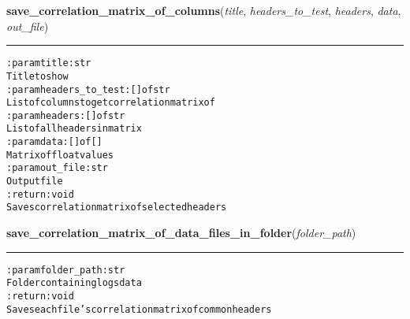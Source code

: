     \label{hal:ml:analysis:correlation:save_correlation_matrix_of_columns}

    \vspace{0.5ex}

\hspace{.8\funcindent}\begin{boxedminipage}{\funcwidth}

    \raggedright \textbf{save\_correlation\_matrix\_of\_columns}(\textit{title}, \textit{headers\_to\_test}, \textit{headers}, \textit{data}, \textit{out\_file})

    \vspace{-1.5ex}

    \rule{\textwidth}{0.5\fboxrule}
\setlength{\parskip}{2ex}
\begin{alltt}

:param title: str
    Title to show
:param headers\_to\_test: [] of str
    List of columns to get correlation matrix of
:param headers: [] of str
    List of all headers in matrix
:param data: [] of []
    Matrix of float values
:param out\_file: str
    Output file
:return: void
    Saves correlation matrix of selected headers
\end{alltt}

\setlength{\parskip}{1ex}
    \end{boxedminipage}

    \label{hal:ml:analysis:correlation:save_correlation_matrix_of_data_files_in_folder}

    \vspace{0.5ex}

\hspace{.8\funcindent}\begin{boxedminipage}{\funcwidth}

    \raggedright \textbf{save\_correlation\_matrix\_of\_data\_files\_in\_folder}(\textit{folder\_path})

    \vspace{-1.5ex}

    \rule{\textwidth}{0.5\fboxrule}
\setlength{\parskip}{2ex}
\begin{alltt}

:param folder\_path: str
    Folder containing logs data
:return: void
    Saves each file's correlation matrix of common headers
\end{alltt}

\setlength{\parskip}{1ex}
    \end{boxedminipage}

